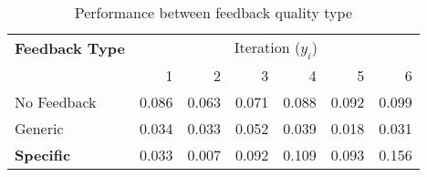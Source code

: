 \begin{table}[!h]
\caption{Performance between feedback quality type}
\label{tab:feedback_type}
\begin{tabular}{l|rrrrrr}
\toprule
\textbf{Feedback Type} & \multicolumn{6}{c}{Iteration ($y_{i}$)} \\
 & 1 & 2 & 3 & 4 & 5 & 6 \\
\midrule
No Feedback & 0.086 & 0.063 & 0.071 & 0.088 & 0.092 & 0.099 \\
Generic & 0.034 & 0.033 & 0.052 & 0.039 & 0.018 & 0.031 \\
\textbf{Specific} & 0.033 & 0.007 & 0.092 & 0.109 & 0.093 & 0.156 \\
\bottomrule
\end{tabular}
\end{table}
